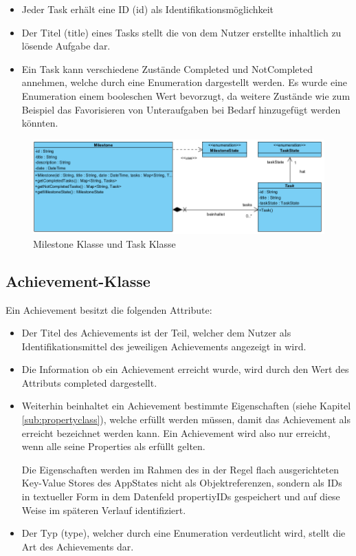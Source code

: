 \documentclass[bibliography=totoc,listof=totoc,BCOR=5mm,DIV=12,oneside]{scrbook}
\begin{document}
\begin{itemize}
\item Jeder Task erhält eine ID (id) als Identifikationsmöglichkeit
\item Der Titel (title) eines Tasks stellt die von dem Nutzer erstellte inhaltlich zu lösende Aufgabe dar.
\item Ein Task kann verschiedene Zustände Completed und NotCompleted annehmen, welche durch eine Enumeration dargestellt werden. Es wurde eine Enumeration einem booleschen Wert bevorzugt, da weitere Zustände wie zum Beispiel das Favorisieren von Unteraufgaben bei Bedarf hinzugefügt werden könnten.
\end{itemize}

\newpage
\begin{figure}[H]
	\centering
	\includegraphics[width=1\textwidth, keepaspectratio]{Bilder/ClassMilestoneAndTask.png}
	\caption{Milestone Klasse und Task Klasse}
	\label{img:ClassMilestoneAndTask}
\end{figure}

\subsection{Achievement-Klasse}
\par Ein Achievement besitzt die folgenden Attribute:

\begin{itemize}
\item \par Der Titel des Achievements ist der Teil, welcher dem Nutzer als Identifikationsmittel des jeweiligen Achievements angezeigt in wird. 
\item \par Die Information ob ein Achievement erreicht wurde, wird durch den Wert des Attributs completed dargestellt.

\item \par Weiterhin beinhaltet ein Achievement bestimmte Eigenschaften (siehe Kapitel \ref{sub:propertyclass}), welche erfüllt werden müssen, damit das Achievement als erreicht bezeichnet werden kann. Ein Achievement wird also nur erreicht, wenn alle seine Properties als erfüllt gelten. 
\par Die Eigenschaften  werden im Rahmen des in der Regel flach ausgerichteten Key-Value Stores des AppStates nicht als Objektreferenzen, sondern als IDs in textueller Form in dem Datenfeld propertiyIDs gespeichert und auf diese Weise im späteren Verlauf identifiziert.
\item \par Der Typ (type), welcher durch eine Enumeration verdeutlicht wird, stellt die Art des Achievements dar.
\end{itemize}
\end{document}
